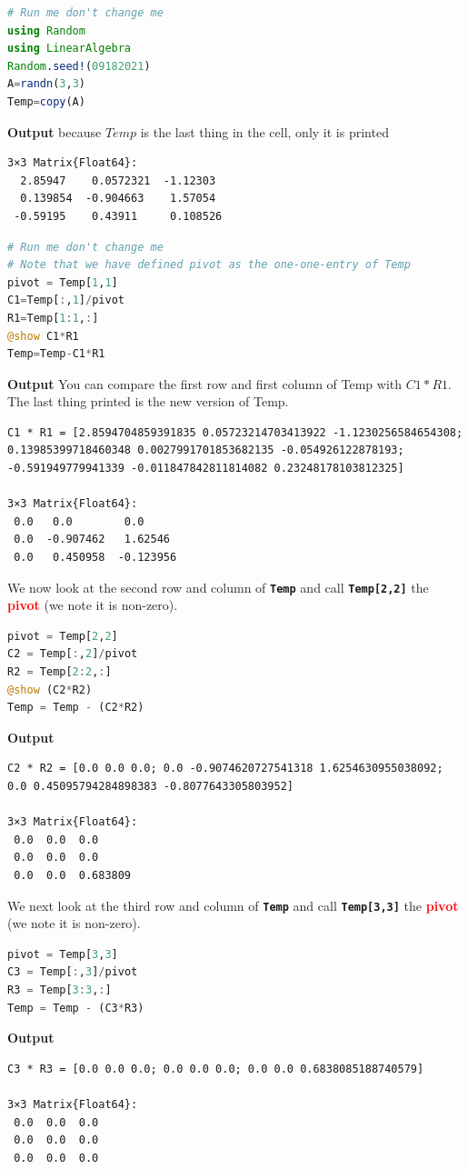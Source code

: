   
\begin{lstlisting}[language=Julia,style=mystyle]
# Run me don't change me
using Random
using LinearAlgebra
Random.seed!(09182021)
A=randn(3,3)
Temp=copy(A)
\end{lstlisting}
\textbf{Output} because $Temp$ is the last thing in the cell, only it is printed 
\begin{verbatim}
3×3 Matrix{Float64}:
  2.85947    0.0572321  -1.12303
  0.139854  -0.904663    1.57054
 -0.59195    0.43911     0.108526
\end{verbatim}
\begin{lstlisting}[language=Julia,style=mystyle]
# Run me don't change me
# Note that we have defined pivot as the one-one-entry of Temp
pivot = Temp[1,1]
C1=Temp[:,1]/pivot
R1=Temp[1:1,:]
@show C1*R1
Temp=Temp-C1*R1
\end{lstlisting}
\textbf{Output} You can compare the first row and first column of Temp with $C1 * R1$. The last thing printed is the new version of Temp.
\begin{verbatim}
C1 * R1 = [2.8594704859391835 0.05723214703413922 -1.1230256584654308;
0.13985399718460348 0.0027991701853682135 -0.054926122878193;
-0.591949779941339 -0.011847842811814082 0.23248178103812325]

3×3 Matrix{Float64}:
 0.0   0.0        0.0
 0.0  -0.907462   1.62546
 0.0   0.450958  -0.123956
\end{verbatim}

We now look at the second row and column of \texttt{\bf Temp} and call \texttt{\bf Temp[2,2]} the \textcolor{red}{\bf pivot} (we note it is non-zero).
\begin{lstlisting}[language=Julia,style=mystyle]
pivot = Temp[2,2]
C2 = Temp[:,2]/pivot
R2 = Temp[2:2,:]
@show (C2*R2)
Temp = Temp - (C2*R2)
\end{lstlisting}
\textbf{Output}
\begin{verbatim}
C2 * R2 = [0.0 0.0 0.0; 0.0 -0.9074620727541318 1.6254630955038092; 
0.0 0.45095794284898383 -0.8077643305803952]

3×3 Matrix{Float64}:
 0.0  0.0  0.0
 0.0  0.0  0.0
 0.0  0.0  0.683809
\end{verbatim}    
   We next look at the third row and column of \texttt{\bf Temp} and call \texttt{\bf Temp[3,3]} the \textcolor{red}{\bf pivot} (we note it is non-zero). 
\begin{lstlisting}[language=Julia,style=mystyle]
pivot = Temp[3,3]
C3 = Temp[:,3]/pivot
R3 = Temp[3:3,:]
Temp = Temp - (C3*R3)
\end{lstlisting}
\textbf{Output}
\begin{verbatim}
C3 * R3 = [0.0 0.0 0.0; 0.0 0.0 0.0; 0.0 0.0 0.6838085188740579]

3×3 Matrix{Float64}:
 0.0  0.0  0.0
 0.0  0.0  0.0
 0.0  0.0  0.0
\end{verbatim}  

